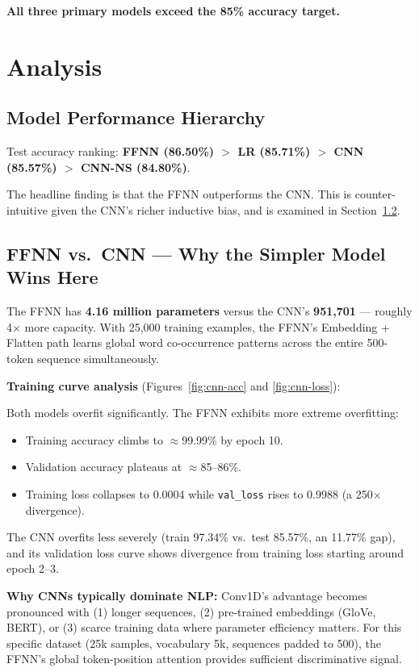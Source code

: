 \documentclass[12pt,a4paper]{article}
\begin{document}
\textbf{All three primary models exceed the 85\% accuracy target.}

\section{Analysis}

\subsection{Model Performance Hierarchy}

Test accuracy ranking: \textbf{FFNN (86.50\%) $>$ LR (85.71\%) $>$ CNN (85.57\%)
$>$ CNN-NS (84.80\%)}.

The headline finding is that the FFNN outperforms the CNN. This is counter-intuitive given
the CNN's richer inductive bias, and is examined in Section~\ref{sec:ffnn-vs-cnn}.

\subsection{FFNN vs.\ CNN --- Why the Simpler Model Wins Here}
\label{sec:ffnn-vs-cnn}

The FFNN has \textbf{4.16 million parameters} versus the CNN's \textbf{951,701} ---
roughly 4$\times$ more capacity. With 25,000 training examples, the FFNN's
Embedding + Flatten path learns global word co-occurrence patterns across the entire
500-token sequence simultaneously.

\textbf{Training curve analysis} (Figures~\ref{fig:cnn-acc} and \ref{fig:cnn-loss}):

Both models overfit significantly. The FFNN exhibits more extreme overfitting:
\begin{itemize}
  \item Training accuracy climbs to $\approx$99.99\% by epoch 10.
  \item Validation accuracy plateaus at $\approx$85--86\%.
  \item Training loss collapses to 0.0004 while \texttt{val\_loss} rises to 0.9988
        (a 250$\times$ divergence).
\end{itemize}
The CNN overfits less severely (train 97.34\% vs.\ test 85.57\%, an 11.77\% gap), and
its validation loss curve shows divergence from training loss starting around epoch 2--3.

\textbf{Why CNNs typically dominate NLP:} Conv1D's advantage becomes pronounced with
(1) longer sequences, (2) pre-trained embeddings (GloVe, BERT), or (3) scarce training
data where parameter efficiency matters. For this specific dataset (25k samples,
vocabulary 5k, sequences padded to 500), the FFNN's global token-position attention
provides sufficient discriminative signal.
\end{document}
